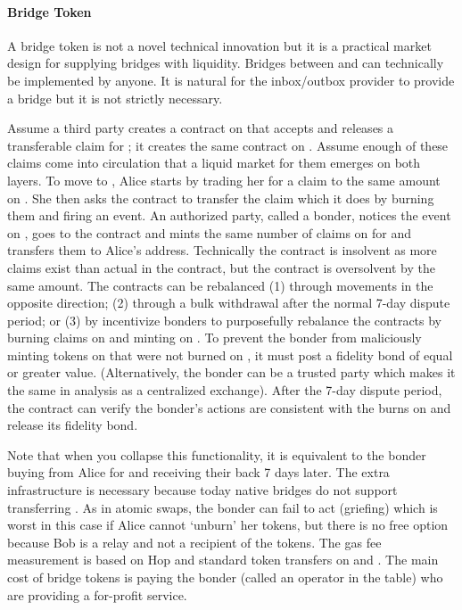 
\paragraph*{Bridge Token} A bridge token is not a novel technical innovation but it is a practical market design for supplying bridges with liquidity. Bridges between \layerone and \layertwo can technically be implemented by anyone. It is natural for the inbox/outbox provider to provide a bridge but it is not strictly necessary. 

Assume a third party creates a contract on \layerone that accepts \ethone and releases a transferable claim for \ethone; it creates the same contract on \layertwo. Assume enough of these claims come into circulation that a liquid market for them emerges on both layers.  To move \ethtwo to \ethone, Alice starts by trading her \ethtwo for a claim to the same amount on \layertwo. She then asks the \layertwo contract to transfer the claim which it does by burning them and firing an event. An authorized party, called a bonder, notices the event on \layertwo, goes to the \layerone contract and mints the same number of claims on \layerone for \ethone and transfers them to Alice's address. Technically the \layerone contract is insolvent as more claims exist than actual \ethone in the contract, but the \layertwo contract is oversolvent by the same amount. The contracts can be rebalanced (1)  through movements in the opposite direction; (2) through a bulk withdrawal after the normal 7-day dispute period; or (3) by incentivize bonders to purposefully rebalance the contracts by burning claims on \layerone and minting on \layertwo. To prevent the bonder from maliciously minting tokens on \layerone that were not burned on \layertwo, it must post a fidelity bond of equal or greater value. (Alternatively, the bonder can be a trusted party which makes it the same in analysis as a centralized exchange). After the 7-day dispute period, the \layerone contract can verify the bonder's actions are consistent with the burns on \layertwo and release its fidelity bond. 

Note that when you collapse this functionality, it is equivalent to the bonder buying \ethxx from Alice for \ethone and receiving their \ethone back 7 days later. The extra infrastructure is necessary because today native bridges do not support transferring \ethxx. As in atomic swaps, the bonder can fail to act (griefing) which is worst in this case if Alice cannot `unburn' her tokens, but there is no free option because Bob is a relay and not a recipient of the tokens. The gas fee measurement is based on Hop and standard token transfers on \layerone and \layertwo. The main cost of bridge tokens is paying the bonder (called an operator in the table) who are providing a for-profit service. 

